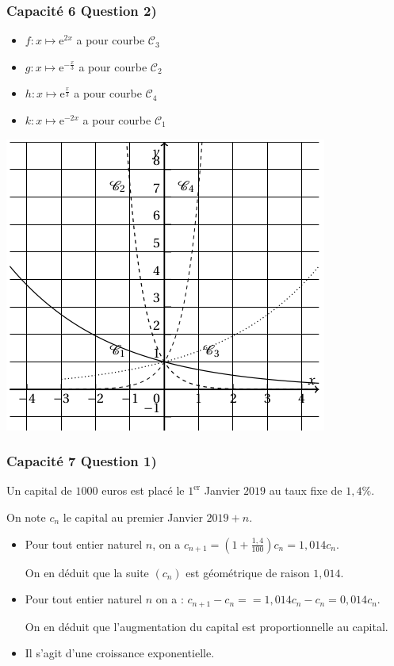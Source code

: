 \documentclass[11pt, hyperref={urlcolor=red,%
            linkcolor=blue, %
            colorlinks=true}]{beamer}
\newcommand{\suite}[1]{\ensuremath{\left(#1_{n}\right)}}
\begin{document}
\begin{frame}
\frametitle{Capacité 6 Question 2)}


	\begin{itemize}
		\item $f:x \mapsto \text{e}^{2x}$ a pour courbe  $\mathcal{C}_{3}$
		\item $g:x \mapsto \text{e}^{-\frac{x}{3}}$ a pour courbe $\mathcal{C}_{2}$
		\item $h:x \mapsto \text{e}^{\frac{x}{3}}$ a pour courbe $\mathcal{C}_{4}$
		\item $k:x \mapsto \text{e}^{-2x}$ a pour courbe $\mathcal{C}_{1}$
	\end{itemize}

\begin{center}
\includegraphics[scale=0.3]{capacite6bisbis.png}
\end{center}


\end{frame}

\begin{frame}
\label{capacite7}
\frametitle{Capacité 7 Question 1)}


Un capital de $1000$ euros est placé le $1^{\text{er}}$ Janvier $2019$ au taux fixe de $1,4 \%$.

On note $c_{n}$ le capital au premier Janvier $2019+n$. 

\begin{itemize}
	\item Pour tout entier naturel $n$, on a $c_{n+1}=\left(1 + \frac{1,4}{100}\right)c_{n}=1,014 c_{n}$.
	
	On en déduit que la suite $\suite{c}$ est géométrique de raison $1,014$.
	
	\item Pour tout entier naturel $n$ on a : $c_{n+1}-c_{n}= = 1,014 c_{n} - c_{n}=0,014c_{n}$.
	
	On en déduit que l'augmentation du capital est proportionnelle au capital.
	
	\item Il s'agit d'une croissance exponentielle.
	
	
	
\end{itemize}
\end{frame}
\end{document}
